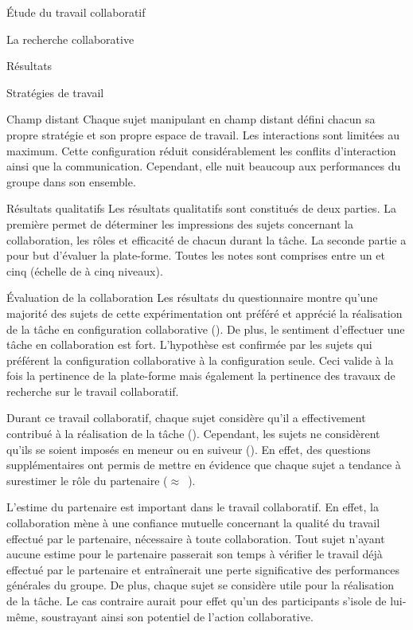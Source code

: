 \documentclass[myfrancais]{mythesis}
\begin{document}
\begin{mypart}{Étude du travail collaboratif}
\begin{mychapter}{La recherche collaborative}
\begin{mysection}{Résultats}
\begin{mysubsection}{Stratégies de travail}
\begin{mysubsubsection}{Champ distant}
						Chaque sujet manipulant en champ distant défini chacun sa propre stratégie et son propre espace de travail.
						Les interactions sont limitées au maximum.
						Cette configuration réduit considérablement les conflits d'interaction ainsi que la communication.
						Cependant, elle nuit beaucoup aux performances du groupe dans son ensemble.
					\end{mysubsubsection}
				\end{mysubsection}
				\begin{mysubsection}{Résultats qualitatifs}
					Les résultats qualitatifs sont constitués de deux parties.
					La première permet de déterminer les impressions des sujets concernant la collaboration, les rôles et efficacité de chacun durant la tâche.
					La seconde partie a pour but d'évaluer la plate-forme.
					Toutes les notes sont comprises entre un et cinq (échelle de  à cinq niveaux).
					\begin{mysubsubsection}{Évaluation de la collaboration}
						Les résultats du questionnaire montre qu'une majorité des sujets de cette expérimentation ont préféré et apprécié la réalisation de la tâche en configuration collaborative ().
						De plus, le sentiment d'effectuer une tâche en collaboration est fort.
						L'hypothèse  est confirmée par les sujets qui préférent la configuration collaborative à la configuration seule.
						Ceci valide à la fois la pertinence de la plate-forme mais également la pertinence des travaux de recherche sur le travail collaboratif.

						Durant ce travail collaboratif, chaque sujet considère qu'il a effectivement contribué à la réalisation de la tâche ().
						Cependant, les sujets ne considèrent qu'ils se soient imposés en meneur ou en suiveur ().
						En effet, des questions supplémentaires ont permis de mettre en évidence que chaque sujet a tendance à surestimer le rôle du partenaire ($\approx$~).

						L'estime du partenaire est important dans le travail collaboratif.
						En effet, la collaboration mène à une confiance mutuelle concernant la qualité du travail effectué par le partenaire, nécessaire à toute collaboration.
						Tout sujet n'ayant aucune estime pour le partenaire passerait son temps à vérifier le travail déjà effectué par le partenaire et entraînerait une perte significative des performances générales du groupe.
						De plus, chaque sujet se considère utile pour la réalisation de la tâche.
						Le cas contraire aurait pour effet qu'un des participants s'isole de lui-même, soustrayant ainsi son potentiel de l'action collaborative.



\end{mysubsubsection}
\end{mysubsection}
\end{mysection}
\end{mychapter}
\end{mypart}
\end{document}
